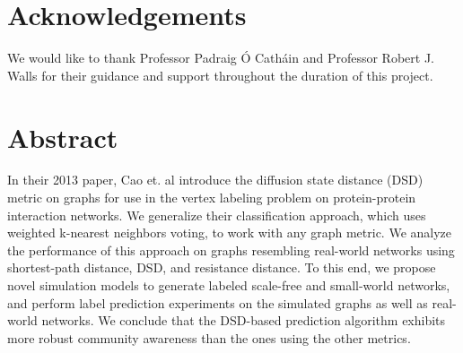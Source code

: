 \section*{Acknowledgements}

We would like to thank Professor Padraig \'O Cath\'ain and Professor Robert J. Walls for their
guidance and support throughout the duration of this project.

\section*{Abstract}

In their 2013 paper, Cao et. al introduce the diffusion state distance (DSD) metric on graphs for
use in the vertex labeling problem on protein-protein interaction networks. We generalize their
classification approach, which uses weighted k-nearest neighbors voting, to work with any graph
metric. We analyze the performance of this approach on graphs resembling real-world networks using
shortest-path distance, DSD, and resistance distance. To this end, we propose novel simulation
models to generate labeled scale-free and small-world networks, and perform label prediction
experiments on the simulated graphs as well as real-world networks. We conclude that the DSD-based
prediction algorithm exhibits more robust community awareness than the ones using the other metrics.
